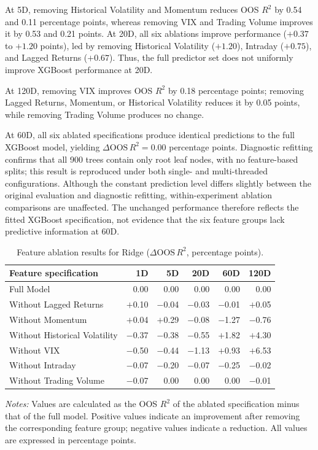 \documentclass[runningheads,orivec]{llncs}
\begin{document}
At 5D, removing Historical Volatility and Momentum reduces OOS $R^2$ by 0.54 and 0.11 percentage points, whereas removing VIX and Trading Volume improves it by 0.53 and 0.21 points. At 20D, all six ablations improve performance ($+0.37$ to $+1.20$ points), led by removing Historical Volatility ($+1.20$), Intraday ($+0.75$), and Lagged Returns ($+0.67$). Thus, the full predictor set does not uniformly improve XGBoost performance at 20D.

At 120D, removing VIX improves OOS $R^2$ by 0.18 percentage points; removing Lagged Returns, Momentum, or Historical Volatility reduces it by 0.05 points, while removing Trading Volume produces no change.

At 60D, all six ablated specifications produce identical predictions to the full XGBoost model, yielding $\Delta \mathrm{OOS}\,R^2 = 0.00$ percentage points. Diagnostic refitting confirms that all 900 trees contain only root leaf nodes, with no feature-based splits; this result is reproduced under both single- and multi-threaded configurations. Although the constant prediction level differs slightly between the original evaluation and diagnostic refitting, within-experiment ablation comparisons are unaffected. The unchanged performance therefore reflects the fitted XGBoost specification, not evidence that the six feature groups lack predictive information at 60D.

\begin{table}[htbp]
\centering
\caption{Feature ablation results for Ridge ($\Delta \mathrm{OOS}\,R^2$, percentage points).}\label{tab:ablation_ridge}
{\footnotesize
\setlength{\tabcolsep}{6pt}
\begin{tabular}{lrrrrr}
\hline
Feature specification & 1D & 5D & 20D & 60D & 120D \\
\hline
Full Model & 0.00 & 0.00 & 0.00 & 0.00 & 0.00 \\
Without Lagged Returns & $+$0.10 & $-$0.04 & $-$0.03 & $-$0.01 & $+$0.05 \\
Without Momentum & $+$0.04 & $+$0.29 & $-$0.08 & $-$1.27 & $-$0.76 \\
Without Historical Volatility & $-$0.37 & $-$0.38 & $-$0.55 & $+$1.82 & $+$4.30 \\
Without VIX & $-$0.50 & $-$0.44 & $-$1.13 & $+$0.93 & $+$6.53 \\
Without Intraday & $-$0.07 & $-$0.20 & $-$0.07 & $-$0.25 & $-$0.02 \\
Without Trading Volume & $-$0.07 & 0.00 & 0.00 & 0.00 & $-$0.01 \\
\hline
\end{tabular}
}
\par\vspace{4pt}\parbox{\linewidth}{\scriptsize\textit{Notes:} Values are calculated as the OOS $R^2$ of the ablated specification minus that of the full model. Positive values indicate an improvement after removing the corresponding feature group; negative values indicate a reduction. All values are expressed in percentage points.}
\end{table}
\end{document}
